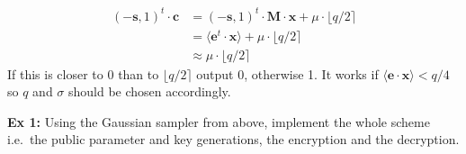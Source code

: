 \documentclass[10pt,a4paper,nobib]{tufte-handout}
\begin{document}
\begin{itemize}
\begin{align*}
  (-\mathbf{s}, 1)^t \cdot \mathbf{c} &= (-\mathbf{s}, 1)^t \cdot \mathbf{M} \cdot \mathbf{x} + \mu \cdot \lfloor q/2 \rceil \\
                                      &= \langle \mathbf{e}^t \cdot \mathbf{x} \rangle + \mu \cdot \lfloor q/2 \rceil \\
                                      &\approx  \mu \cdot \lfloor q/2 \rceil
\end{align*}
If this is closer to 0 than to $\lfloor q/2 \rceil$ output 0, otherwise 1. It works if $\langle \mathbf{e} \cdot \mathbf{x} \rangle < q/4$ so $q$ and $\sigma$ should be chosen accordingly.
\end{itemize}

%
%
\textbf{Ex 1:} Using the Gaussian sampler from above, implement the whole scheme i.e.~the public parameter and key generations, the encryption and the decryption.
\end{document}
